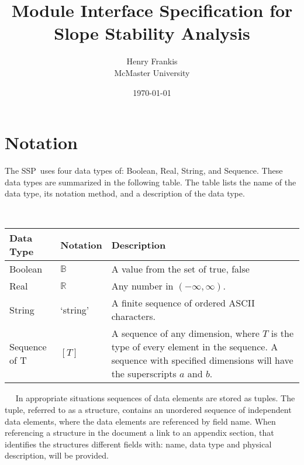 \documentclass[12pt]{article}
\newcommand{\progname}{SSP}
\begin{document}
\title{Module Interface Specification for Slope Stability Analysis} 
\author{Henry Frankis\\McMaster University}
\date{\today}
	
\maketitle
\tableofcontents


\newpage

\section{Notation}

The \progname\ uses four data types of: Boolean, Real, String, and
Sequence. These data types are summarized in the following table. The
table lists the name of the data type, its notation method, and a
description of the data type.

~\newline \renewcommand*{\arraystretch}{1.5}
\begin{tabular}{p{} p{} p{}}
  \hline \textbf{Data Type} & \textbf{Notation} & \textbf{Description}
  \\ \hline

  Boolean & $\mathbb{B}$ & A value from the set of {true, false}\\
  
  Real & $\mathbb{R}$ & Any number in $\left( -\infty, \infty
  \right)$.\\

  String & `string' & A finite sequence of ordered ASCII
  characters.\\

  Sequence of T & $[T]$ & A sequence of any dimension, where $T$ is
  the type of every element in the sequence. A sequence with specified
  dimensions will have the superscripts $a$ and $b$.\\ \hline
\end{tabular}

~\newline~\newline\noindent
In appropriate situations sequences of data elements are stored as
tuples. The tuple, referred to as a structure, contains an unordered
sequence of independent data elements, where the data elements are
referenced by field name. When referencing a structure in the document
a link to an appendix section, that identifies the structures different
fields with: name, data type and physical description, will be
provided.
\end{document}
